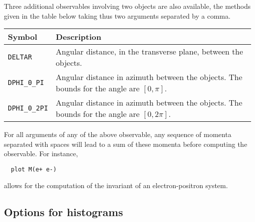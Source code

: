\documentclass[a4paper]{article}
\begin{document}
\noindent Three additional observables involving two objects are also available, the
methods given in the table below taking thus two arguments separated by a comma.
\renewcommand{\arraystretch}{1.2}%
\begin{center}\begin{tabular}{l p{10.0cm}}
\hline
Symbol& Description\\
\hline
\color{ao} \verb?DELTAR?     & Angular distance, in the transverse plane, between the
  objects.\\
\color{ao} \verb?DPHI_0_PI?  & Angular distance in azimuth between the objects. The
  bounds for the angle are $[0,\pi]$.\\
\color{ao} \verb?DPHI_0_2PI? & Angular distance in azimuth between the objects. The
  bounds for the angle are $[0,2\pi]$.\\
\hline
\end{tabular}
\end{center}
\noindent For all arguments of any of the above observable, any sequence of momenta
separated with spaces will lead to a sum of these momenta before computing the
observable. For instance,
{\color{ao} \begin{verbatim}
  plot M(e+ e-)
\end{verbatim}}
\noindent allows for the computation of the invariant of an electron-positron system.
\newpage
\begin{shaded}
\section{\Large Options for histograms}
\end{shaded}
\end{document}
